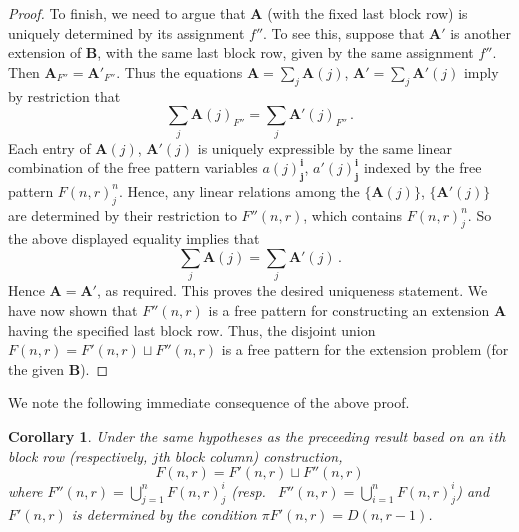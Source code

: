 \documentclass[10pt]{article}
\newtheorem{coro}[theorem]{Corollary}
\theoremstyle{definition}
\providecommand{\resp}{resp.\ }
\newcommand{\bi}{{\boldsymbol{i}}} %
\newcommand{\bj}{{\boldsymbol{j}}}
\newcommand{\bA}{\mathbf{A}}
\newcommand{\bB}{\mathbf{B}}
\begin{document}
\begin{proof}
To finish, we need to argue that $\bA$ (with the fixed last block row)
is uniquely determined by its assignment $f''$. To see this, suppose
that $\bA'$ is another extension of $\bB$, with the same last block
row, given by the same assignment $f''$. Then $\bA_{F''} =
\bA'_{F''}$. Thus the equations $\bA = \sum_j \bA(j)$, $\bA' = \sum_j
\bA'(j)$ imply by restriction that
\[
\textstyle \sum _j \bA(j)_{F''} = \sum_j \bA'(j)_{F''} \, .
\]
Each entry of $\bA(j)$, $\bA'(j)$ is uniquely expressible by the same
linear combination of the free pattern variables $a(j)^\bi_\bj$,
$a'(j)^\bi_\bj$ indexed by the free pattern $F(n,r)^n_j$. Hence, any
linear relations among the $\{\bA(j)\}$, $\{\bA'(j)\}$ are determined
by their restriction to $F''(n,r)$, which contains $F(n,r)^n_j$. So
the above displayed equality implies that
\[
\textstyle \sum _j \bA(j) = \sum_j \bA'(j) \, .
\]
Hence $\bA = \bA'$, as required. This proves the desired uniqueness
statement. We have now shown that $F''(n,r)$ is a free pattern for
constructing an extension $\bA$ having the specified last block
row. Thus, the disjoint union $F(n,r) = F'(n,r) \sqcup F''(n,r)$ is a
free pattern for the extension problem (for the given $\bB$).
\end{proof}

We note the following immediate consequence of the above proof.

\begin{coro}
 Under the same hypotheses as the preceeding result based on an $i$th
 block row \textup{(}respectively, $j$th block column\textup{)}
 construction,
 \[
 F(n,r) = F'(n,r) \sqcup F''(n,r)
 \]
 where $F''(n,r) = \bigcup_{j=1}^n F(n,r)^i_j$ \textup{(}\resp
 $F''(n,r) = \bigcup_{i=1}^n F(n,r)^i_j$\textup{)} and $F'(n,r)$ is
 determined by the condition $\pi F'(n,r) = D(n,r-1)$.
\end{coro}
\end{document}
